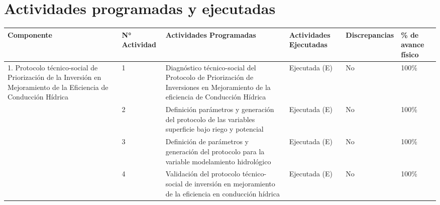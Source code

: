 \documentclass[]{article}
\begin{document}
\section{Actividades programadas y ejecutadas}
\begin{table}[!htb]
\centering
\resizebox{16cm}{!} {
\begin{tabular}{|p{3cm}|p{1.6cm}|p{3.9cm}|p{2.5cm}|p{2.5cm}|p{1.5cm}|}
    \hline
    \textbf{Componente} & \textbf{N° Actividad} & \textbf{Actividades Programadas} & \textbf{Actividades Ejecutadas} & \textbf{Discrepancias} & \textbf{\% de avance físico}\\
    \hline
    \multirow {4}{3cm}{1. Protocolo técnico-social de Priorización de la Inversión en Mejoramiento de la Eficiencia de Conducción Hídrica} & 1 & 		Diagnóstico técnico-social del Protocolo de Priorización de Inversiones en Mejoramiento de la eficiencia de Conducción Hídrica &  Ejecutada (E)  & No & 100\%\\
    \cline{2-6}
    & 2 & Definición parámetros y generación del protocolo de las variables superficie bajo riego y potencial & Ejecutada (E) & No & 100\%\\
    \cline{2-6}
    & 3 & Definición de parámetros y generación del protocolo para la variable modelamiento hidrológico & Ejecutada (E)  & No & 100\%\\
    \cline{2-6}
    & 4 & Validación del protocolo técnico-social de inversión en mejoramiento de la eficiencia en conducción hídrica & Ejecutada (E)  & No & 100\%\\
    \hline
   
\end{tabular}
}
\end{table}
\end{document}
